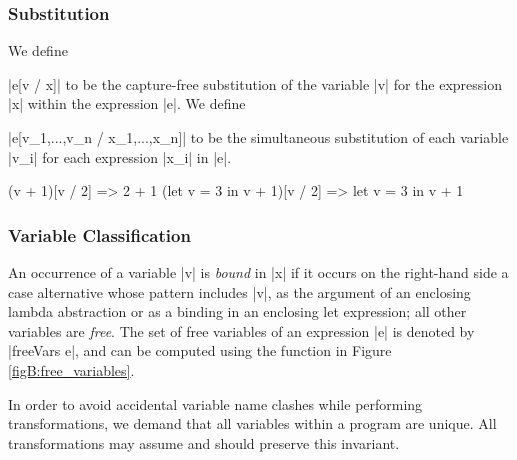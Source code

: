 \subsubsection{Substitution}

We define \ignore|e[v / x]| to be the capture-free substitution of the variable |v| for the expression |x| within the expression |e|. We define \ignore|e[v_1,...,v_n / x_1,...,x_n]| to be the simultaneous substitution of each variable |v_i| for each expression |x_i| in |e|.

\begin{example}
\ignore\begin{code}
(v + 1)[v / 2]               => 2 + 1
(let v = 3 in v + 1)[v / 2]  => let v = 3 in v + 1
\end{code}
\end{example}

\subsubsection{Variable Classification}


An occurrence of a variable |v| is \textit{bound} in |x| if it occurs on the right-hand side a case alternative whose pattern includes |v|, as the argument of an enclosing lambda abstraction or as a binding in an enclosing let expression; all other variables are \textit{free}. The set of free variables of an expression |e| is denoted by |freeVars e|, and can be computed using the function in Figure \ref{figB:free_variables}.

In order to avoid accidental variable name clashes while performing transformations, we demand that all variables within a program are unique. All transformations may assume and should preserve this invariant.


